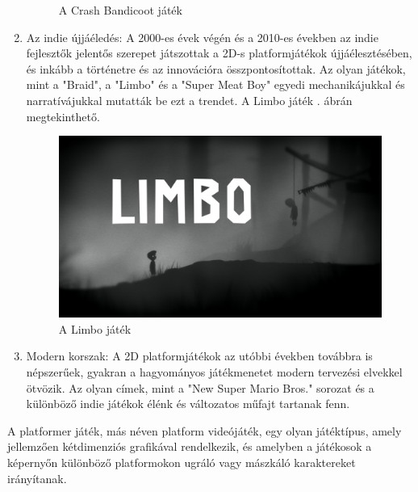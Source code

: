\begin{enumerate}
\begin{figure}[ht]
\caption{A Crash Bandicoot játék}
\label{fig:crashbandicoot}
\end{figure}
\item Az indie újjáéledés: A 2000-es évek végén és a 2010-es években az indie fejlesztők jelentős szerepet játszottak a 2D-s platformjátékok újjáélesztésében, és inkább a történetre és az innovációra összpontosítottak. Az olyan játékok, mint a "Braid", a "Limbo" és a "Super Meat Boy" egyedi mechanikájukkal és narratívájukkal mutatták be ezt a trendet. A Limbo játék . ábrán megtekinthető.
\begin{figure}[ht]
\centering
\includegraphics[scale = 0.3]{images/limbo.jpg}
\caption{A Limbo játék}
\label{fig:limbo}
\end{figure}
\item Modern korszak: A 2D platformjátékok az utóbbi években továbbra is népszerűek, gyakran a hagyományos játékmenetet modern tervezési elvekkel ötvözik. Az olyan címek, mint a "New Super Mario Bros." sorozat és a különböző indie játékok élénk és változatos műfajt tartanak fenn.
\end{enumerate}


A platformer játék, más néven platform videójáték, egy olyan játéktípus, amely jellemzően kétdimenziós grafikával rendelkezik, és amelyben a játékosok a képernyőn különböző platformokon ugráló vagy mászkáló karaktereket irányítanak.

